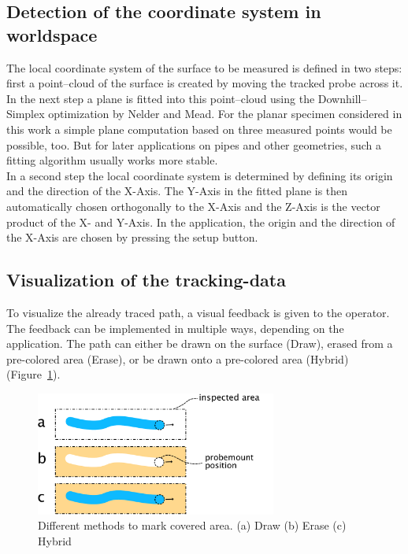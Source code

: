 \documentclass{VRARWorkshop}
\begin{document}
\subsection{Detection of the coordinate system in worldspace}
The local coordinate system of the surface to be measured is defined in two steps:
first a point--cloud of the surface is created by moving the tracked probe across it.
In the next step a plane is fitted into this point--cloud using the Downhill--Simplex optimization by Nelder and Mead. For the planar specimen considered in this work a simple plane computation based on three measured points
would be possible, too. But for later applications on pipes and other geometries, such a fitting algorithm usually works more stable. \\
In a second step the local coordinate system is determined by defining its origin and the direction of the X-Axis. 
The Y-Axis in the fitted plane is then automatically chosen orthogonally to the X-Axis and the Z-Axis is the vector product of the X- and Y-Axis. 
In the application, the origin and the direction of the X-Axis are chosen by pressing the setup button.


\subsection{Visualization of the tracking-data}
\label{sec:DrawVsErase}
To visualize the already traced path, a visual feedback is given to the operator.
The feedback can be implemented in multiple ways, depending on the application.
The path can either be drawn on the surface ({\sc Draw}), erased from a pre-colored area ({\sc Erase}), or be drawn onto a pre-colored area ({\sc Hybrid}) (Figure~\ref{fig:DrawVsErase}).

\begin{figure}[h!]
    \begin{center}
        \includegraphics[width=79mm]{images/DrawVsErase}
        \caption{\label{fig:DrawVsErase} Different methods to mark covered area. (a) {\sc Draw} (b) {\sc Erase} (c) {\sc Hybrid}}
    \end{center}
\end{figure}
\end{document}
